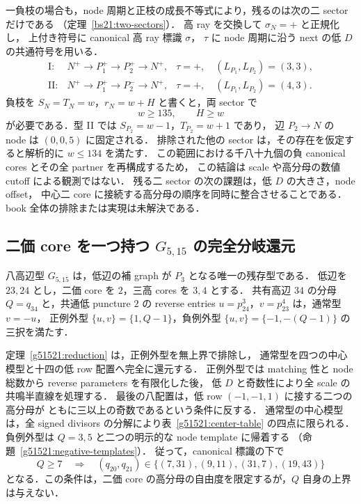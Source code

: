 一負枝の場合も，node 周期と正枝の成長不等式により，残るのは次の二 sector だけである
（定理~\ref{bs21:two-sectors}）．
高 ray を交換して $\sigma_N=+$ と正規化し，
上付き符号に canonical 高 ray 標識 $\sigma$，
$\tau$ に node 周期に沿う next の低 $D$ の共通符号を用いる．
\[
 \begin{array}{ccl}
 \mathrm{I}:&N^+\longrightarrow P_1^+\longrightarrow P_2^+
       \longrightarrow N^+,&
       \tau=+,\quad (L_{P_1},L_{P_2})=(3,3),\\[2pt]
 \mathrm{II}:&N^+\longrightarrow P_1^+\longrightarrow P_2^-
       \longrightarrow N^+,&
       \tau=+,\quad (L_{P_1},L_{P_2})=(4,3).
 \end{array}
\]
負枝を $S_N=T_N=w$，$r_N=w+H$ と書くと，両 sector で
\[
 w\ge135,\qquad H\ge w
\]
が必要である．型 II では $S_{P_2}=w-1$，$T_{P_2}=w+1$ であり，
辺 $P_2\to N$ の node は $(0,0,5)$ に固定される．
排除された他の sector は，その存在を仮定すると解析的に $w\le134$ を満たす．
この範囲における千八十九個の負 canonical cores とその全 partner を再構成するため，
この結論は scale や高分母の数値 cutoff による観測ではない．
残る二 sector の次の課題は，低 $D$ の大きさ，node offset，
中心二 core に接続する高分母の順序を同時に整合させることである．
book 全体の排除または実現は未解決である．

\subsection{二価 core を一つ持つ \texorpdfstring{$G_{5,15}$}{G5,15} の完全分岐還元}

八高辺型 $G_{5,15}$ は，低辺の補 graph が $P_3$ となる唯一の残存型である．
低辺を $23,24$ とし，二価 core を $2$，三高 cores を $3,4$ とする．
共有高辺 $34$ の分母 $Q=q_{34}$ と，共通低 puncture $2$ の reverse entries
$u=p^3_{24}$，$v=p^4_{23}$ は，通常型 $v=-u$，
正例外型 $\{u,v\}=\{1,Q-1\}$，負例外型 $\{u,v\}=\{-1,-(Q-1)\}$ の三択を満たす．

定理~\ref{g51521:reduction} は，正例外型を無上界で排除し，
通常型を四つの中心模型と十四の低 row 配置へ完全に還元する．
正例外型では matching 性と node 総数から reverse parameters を有限化した後，
低 $D$ と奇数性により全 scale の共鳴半直線を処理する．
最後の八配置は，低 row $(-1,-1,1)$ に接する二つの高分母が
ともに三以上の奇数であるという条件に反する．
通常型の中心模型は，全 signed divisors の分解により表~\ref{g51521:center-table} の四点に限られる．
負例外型は $Q=3,5$ と二つの明示的な node template に帰着する
（命題~\ref{g51521:negative-templates}）．
従って，canonical 標識の下で
\[
 Q\ge7\quad\Longrightarrow\quad
 (q_{20},q_{21})\in\{(7,31),(9,11),(31,7),(19,43)\}
\]
となる．この条件は，二価 core の高分母の自由度を限定するが，$Q$ 自身の上界は与えない．

